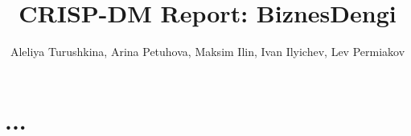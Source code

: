 \documentclass[oneside,final,12pt,a4paper]{extreport}
\title{CRISP-DM Report: BiznesDengi}
\author{Aleliya Turushkina, Arina Petuhova, Maksim Ilin, Ivan Ilyichev, Lev Permiakov}
\begin{document}
\maketitle

\newpage

\section{...}
\end{document}
